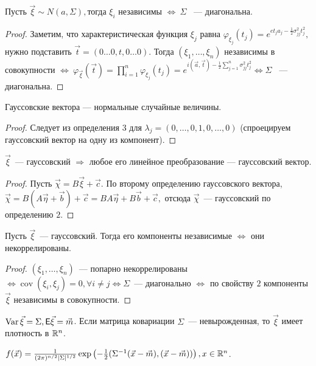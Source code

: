 	\begin{property}
		Пусть \(\vec{\xi}\sim N(a, \Sigma), \)тогда \(\xi_i\) независимы \(\Leftrightarrow~\Sigma\) ~--- диагональна.
		\begin{proof}
			Заметим, что характеристическая функция \(\xi_j\) равна \(\varphi_{\xi_j}(t_j) = e^{et_ja_j - \frac{1}{2}\sigma^2_{jj}t_j^2},\) нужно подставить \(\vec{t} = (0\ldots0, t, 0\ldots0).\) Тогда \((\xi_1, \ldots, \xi_n)\) независимы в совокупности \(\Leftrightarrow ~ \varphi_{\vec{\xi}}(\vec{t}) = \prod\limits_{i =1 }^n \varphi_{\xi_j}(t_j) = e^{i(\vec{a}, \vec{t}) - \frac{1}{2}\sum\limits_{j = 1}^{n}\sigma_{jj}^2t_j^2} \Leftrightarrow \Sigma\) ~--- диагональна.
		\end{proof}
	\end{property}

	\begin{property}[Коши]
		Гауссовские вектора --- нормальные случайные величины.
		\begin{proof}
			Следует из определения \(3\) для \(\lambda_j = (0, \ldots, 0, 1, 0, \ldots, 0)\) (спроецируем гауссовский вектор на одну из компонент).
		\end{proof}
	\end{property}

	\begin{property}
		\(\vec{\xi}\)~--- гауссовский \(\Rightarrow\) любое его линейное преобразование --- гауссовский вектор.
		\begin{proof}
			Пусть \(\vec{\chi} = B\vec{\xi} + \vec{c}.\) По второму определению гауссовского вектора, \(\vec{\chi} = B(A\vec{\eta} + \vec{b}) + \vec{c} = BA\vec{\eta} + B\vec{b} + \vec{c},\) отсюда \(\vec{\chi}\)~--- гауссовский по определению \(2.\)
		\end{proof}
	\end{property}
	
	\begin{property}
		Пусть \(\vec{\xi}\)~--- гауссовский. Тогда его компоненты независимые \(\Leftrightarrow\) они некоррелированы.
		\begin{proof}
			\((\xi_1, \ldots, \xi_n)\)~--- попарно некоррелированы \(\Leftrightarrow \operatorname{cov}(\xi_i, \xi_j) = 0, \forall i \neq j \Leftrightarrow \Sigma\)~--- диагонально \(\Leftrightarrow\) по свойству \(2\) компоненты \(\vec{\xi}\) независимы в совокупности.
		\end{proof}
	\end{property}
	
    \begin{property}
    	$\operatorname{Var} \vec{\xi} = \Sigma, \mathsf{E}\vec{\xi} = \vec{m}$. Если матрица ковариации $\Sigma$~--- невырожденная, то $\vec{\xi}$ имеет плотность в $\mathbb{R}^n$.
    	
    	$f(\vec{x}) = \frac{1}{(2\pi)^{n / 2}|\Sigma|^{1/2}} \exp\left(-\frac{1}{2}(\Sigma^{-1}(\vec{x} - \vec{m}), (\vec{x} - \vec{m}))\right), x \in \mathbb{R}^n$.
    \end{property}

